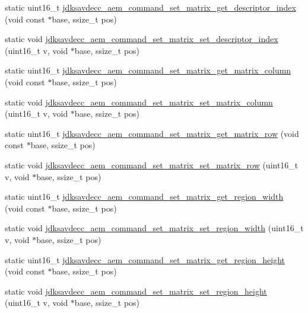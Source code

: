 \begin{DoxyCompactItemize}
static uint16\+\_\+t \hyperlink{group__command__set__matrix_ga2885acb0f0ace45fff15b2ec4c0a7f73}{jdksavdecc\+\_\+aem\+\_\+command\+\_\+set\+\_\+matrix\+\_\+get\+\_\+descriptor\+\_\+index} (void const $\ast$base, ssize\+\_\+t pos)
\item 
static void \hyperlink{group__command__set__matrix_ga3f538e61ffb5f8f6e95fa8d8836ac90b}{jdksavdecc\+\_\+aem\+\_\+command\+\_\+set\+\_\+matrix\+\_\+set\+\_\+descriptor\+\_\+index} (uint16\+\_\+t v, void $\ast$base, ssize\+\_\+t pos)
\item 
static uint16\+\_\+t \hyperlink{group__command__set__matrix_ga39f9be0a23bef37f0c2141732a64f310}{jdksavdecc\+\_\+aem\+\_\+command\+\_\+set\+\_\+matrix\+\_\+get\+\_\+matrix\+\_\+column} (void const $\ast$base, ssize\+\_\+t pos)
\item 
static void \hyperlink{group__command__set__matrix_gac30847873ca76d4467e468e3afb6c7ab}{jdksavdecc\+\_\+aem\+\_\+command\+\_\+set\+\_\+matrix\+\_\+set\+\_\+matrix\+\_\+column} (uint16\+\_\+t v, void $\ast$base, ssize\+\_\+t pos)
\item 
static uint16\+\_\+t \hyperlink{group__command__set__matrix_ga87050fb9816d90a43c37223d823eea96}{jdksavdecc\+\_\+aem\+\_\+command\+\_\+set\+\_\+matrix\+\_\+get\+\_\+matrix\+\_\+row} (void const $\ast$base, ssize\+\_\+t pos)
\item 
static void \hyperlink{group__command__set__matrix_gad36a5fd11832d3526dd64e171eb629db}{jdksavdecc\+\_\+aem\+\_\+command\+\_\+set\+\_\+matrix\+\_\+set\+\_\+matrix\+\_\+row} (uint16\+\_\+t v, void $\ast$base, ssize\+\_\+t pos)
\item 
static uint16\+\_\+t \hyperlink{group__command__set__matrix_ga3d74ef8efa3dda8319f7078c56c8006c}{jdksavdecc\+\_\+aem\+\_\+command\+\_\+set\+\_\+matrix\+\_\+get\+\_\+region\+\_\+width} (void const $\ast$base, ssize\+\_\+t pos)
\item 
static void \hyperlink{group__command__set__matrix_ga8d5c5405af6b74c13aa4260ef81a0e50}{jdksavdecc\+\_\+aem\+\_\+command\+\_\+set\+\_\+matrix\+\_\+set\+\_\+region\+\_\+width} (uint16\+\_\+t v, void $\ast$base, ssize\+\_\+t pos)
\item 
static uint16\+\_\+t \hyperlink{group__command__set__matrix_gacbf4c7b3a1b6acb68446933156c97d3b}{jdksavdecc\+\_\+aem\+\_\+command\+\_\+set\+\_\+matrix\+\_\+get\+\_\+region\+\_\+height} (void const $\ast$base, ssize\+\_\+t pos)
\item 
static void \hyperlink{group__command__set__matrix_gaee0bb039ff3476a18a7825de351edff1}{jdksavdecc\+\_\+aem\+\_\+command\+\_\+set\+\_\+matrix\+\_\+set\+\_\+region\+\_\+height} (uint16\+\_\+t v, void $\ast$base, ssize\+\_\+t pos)

\end{DoxyCompactItemize}
